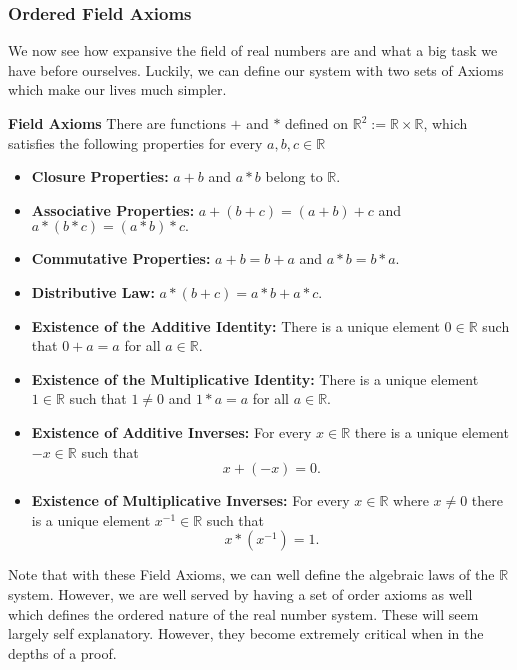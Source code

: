 \subsubsection{Ordered Field Axioms}

We now see how expansive the field of real numbers are and what a big task we have before ourselves. Luckily, we can define our system with two sets of Axioms which make our lives much simpler.

\begin{definition} \textbf{Field Axioms} \newline
There are functions $+$ and $*$ defined on $\mathbb{R}^2 := \mathbb{R} \times \mathbb{R}$, which satisfies the following properties for every $a,b,c \in \mathbb{R}$
\begin{itemize}
\item \textbf{Closure Properties:} $a+b$ and $a*b$ belong to $\mathbb{R}.$
\item \textbf{Associative Properties:} $a+(b+c) = (a+b)+c$ and $a*(b*c)=(a*b)*c.$
\item \textbf{Commutative Properties:} $a+b=b+a$ and $a*b=b*a.$
\item \textbf{Distributive Law:} $a*(b+c) = a*b+a*c.$
\item \textbf{Existence of the Additive Identity:} There is a unique element $0 \in \mathbb{R}$ such that $0+a=a$ for all $a \in \mathbb{R}.$
\item \textbf{Existence of the Multiplicative Identity:} There is a unique element $1 \in \mathbb{R}$ such that $1 \neq 0$ and $1*a = a$ for all $a \in \mathbb{R}.$
\item \textbf{Existence of Additive Inverses:} For every $x \in \mathbb{R}$ there is a unique element $-x \in \mathbb{R}$ such that $$ x + (-x) = 0.$$
\item \textbf{Existence of Multiplicative Inverses:} For every $x \in \mathbb{R}$ where $x \neq 0$ there is a unique element $x^{-1} \in \mathbb{R}$ such that $$x*(x^{-1}) = 1.$$
\end{itemize}
\end{definition}

Note that with these Field Axioms, we can well define the algebraic laws of the $\mathbb{R}$ system. However, we are well served by having a set of order axioms as well which defines the ordered nature of the real number system. These will seem largely self explanatory. However, they become extremely critical when in the depths of a proof.\newline


